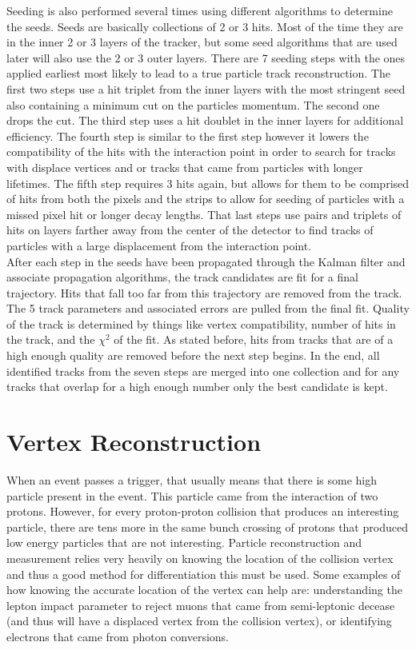 	Seeding is also performed several times using different algorithms to determine the seeds. Seeds are basically collections of 2 or 3 hits. Most of the time they are in the inner 2 or 3 layers of the tracker, but some seed algorithms that are used later will also use the 2 or 3 outer layers. There are 7 seeding steps with the ones applied earliest most likely to lead to a true particle track reconstruction. The first two steps use a hit triplet from the inner layers with the most stringent seed also containing a minimum \pt cut on the particles momentum. The second one drops the \pt cut. The third step uses a hit doublet in the inner layers for additional efficiency. The fourth step is similar to the first step however it lowers the compatibility of the hits with the interaction point in order to search for tracks with displace vertices and or tracks that came from particles with longer lifetimes. The fifth step requires 3 hits again, but allows for them to be comprised of hits from both the pixels and the strips to allow for seeding of particles with a missed pixel hit or longer decay lengths. That last steps use pairs and triplets of hits on layers farther away from the center of the detector to find tracks of particles with a large displacement from the interaction point.\\
	
	After each step in the seeds have been propagated through the Kalman filter and associate propagation algorithms, the track candidates are fit for a final trajectory. Hits that fall too far from this trajectory are removed from the track. The 5 track parameters and associated errors are pulled from the final fit. Quality of the track is determined by things like vertex compatibility, number of hits in the track, and the $\chi ^2$ of the fit. As stated before, hits from tracks that are of a high enough quality are removed before the next step begins. In the end, all identified tracks from the seven steps are merged into one collection and for any tracks that overlap for a high enough number only the best candidate is kept.\\
	
		
	\section{Vertex Reconstruction}
	When an event passes a trigger, that usually means that there is some high \pt particle present in the event. This particle came from the interaction of two protons. However, for every proton-proton collision that produces an interesting particle, there are tens more in the same bunch crossing of protons that produced low energy particles that are not interesting. Particle reconstruction and measurement relies very heavily on knowing the location of the collision vertex and thus a good method for differentiation this must be used. Some examples of how knowing the accurate location of the vertex can help are: understanding the lepton impact parameter to reject muons that came from semi-leptonic decease (and thus will have a displaced vertex from the collision vertex), or identifying electrons that came from photon conversions.\\
	
